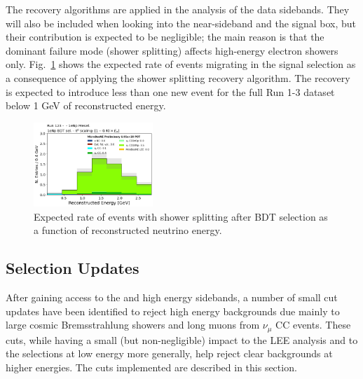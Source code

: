 The recovery algorithms are applied in the analysis of the \npsel data sidebands. They will also be included when looking into the near-sideband and the signal box, but their contribution is expected to be negligible; the main reason is that the dominant failure mode (shower splitting) affects high-energy electron showers only. Fig.~\ref{shrsplt-rate-vs-recoe} shows the expected rate of events migrating in the signal selection as a consequence of applying the shower splitting recovery algorithm. The recovery is expected to introduce less than one new event for the full Run 1-3 dataset below 1 GeV of reconstructed energy.

\begin{figure}[H]
    \centering
    \includegraphics[width=0.40\textwidth]{Sidebands/Figures/CutUpdates/shrsplt-rate-vs-recoe.png}
    \caption{Expected rate of events with shower splitting after BDT selection as a function of reconstructed neutrino energy.}
    \label{shrsplt-rate-vs-recoe}
\end{figure}


\subsection{Selection Updates}
\label{sec:sideband:newcuts}
\par After gaining access to the \npsel and \zpsel high energy sidebands, a number of small cut updates have been identified to reject high energy backgrounds due mainly to large cosmic Bremsstrahlung showers and long muons from $\nu_{\mu}$ CC events. These cuts, while having a small (but non-negligible) impact to the LEE analysis and to the selections at low energy more generally, help reject clear backgrounds at higher energies. The cuts implemented are described in this section.

